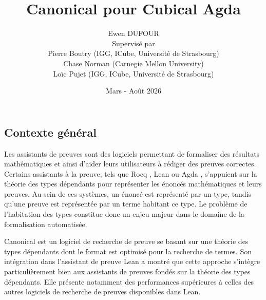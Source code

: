 \documentclass[11pt]{article}
\begin{document}
\title{Canonical pour Cubical Agda}


\author{Ewen DUFOUR\\[1ex]
{\small Supervisé par}\\ 
{\small Pierre Boutry (IGG, ICube, Université de Strasbourg)} \\ 
{\small Chase Norman (Carnegie Mellon University)} \\ 
{\small Loïc Pujet (IGG, ICube, Université de Strasbourg)}}

\date{Mars - Août 2026}

\maketitle




\subsection*{Contexte général} 
Les assistants de preuves sont des logiciels permettant de formaliser des résultats mathématiques et 
ainsi d'aider leurs utilisateurs à rédiger des preuves correctes. 
Certains assistants à la preuve, tels que Rocq \cite{rocq}, Lean \cite{demoura2021lean4} ou Agda \cite{norell2008agda}, 
s'appuient sur la théorie des types dépendants pour représenter les énoncés mathématiques et leurs preuves.
Au sein de ces systèmes, un énoncé est représenté par un type, tandis qu'une preuve est représentée par un terme habitant ce type.
Le problème de l'habitation des types constitue donc un enjeu majeur dans le domaine de la formalisation automatisée.

Canonical \cite{norman2025canonical} est un logiciel de recherche de preuve 
se basant sur une théorie des types dépendants dont le format est optimisé pour la recherche de termes.
Son intégration dans l’assistant de preuve Lean a montré que cette approche 
s’intègre particulièrement bien aux assistants de preuves fondés sur la théorie des types dépendants. 
Elle présente notamment des performances supérieures à celles des autres logiciels de recherche de preuves disponibles dans Lean.
\end{document}
